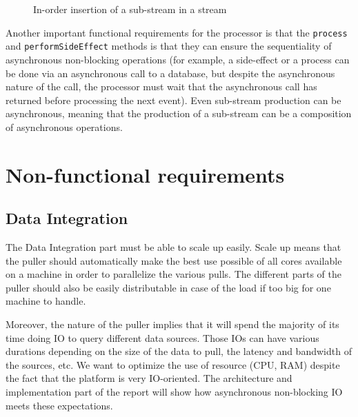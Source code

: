 \begin{figure}[h]
  \begin{center} 
    \caption{In-order insertion of a sub-stream in a stream}
    \label{fig:substream}
  \end{center}
\end{figure}

Another important functional requirements for the processor is that the \verb|process| and \verb|performSideEffect| methods is that they can ensure the
sequentiality of asynchronous non-blocking operations (for example, a side-effect or a process can be done via an asynchronous call to a 
database, but despite the asynchronous nature of the call, the processor must wait that the asynchronous call has returned
before processing the next event). Even sub-stream production can be asynchronous, meaning that the production of a sub-stream
can be a composition of asynchronous operations.


\section{Non-functional requirements}

\subsection{Data Integration}

The Data Integration part must be able to scale up easily. Scale up means that the puller should automatically make the best
use possible of all cores available on a machine in order to parallelize the various pulls. The different parts of the puller 
should also be easily distributable in case of the load if too big for one machine to handle. 

Moreover, the nature of the puller implies that it will spend the majority of its time doing IO to query different data sources.
Those IOs can have various durations depending on the size of the data to pull, the latency and bandwidth of the sources, etc.
We want to optimize the use of resource (CPU, RAM) despite the fact that the platform is very IO-oriented. The architecture and implementation part
of the report will show how asynchronous non-blocking IO meets these expectations.

